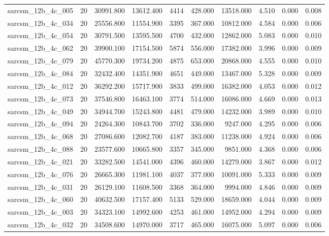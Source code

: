 \begin{tabular}{lrrrrrrrrr}
sarcsm\_12b\_4c\_005 & 20 & 30991.800 & 13612.400 & 4414 & 428.000 & 13518.000 & 4.510 & 0.000 & 0.008 \\
sarcsm\_12b\_4c\_034 & 20 & 25556.800 & 11554.900 & 3395 & 367.000 & 10812.000 & 4.584 & 0.000 & 0.006 \\
sarcsm\_12b\_4c\_054 & 20 & 30791.500 & 13595.500 & 4700 & 432.000 & 12862.000 & 5.083 & 0.000 & 0.010 \\
sarcsm\_12b\_4c\_062 & 20 & 39900.100 & 17154.500 & 5874 & 556.000 & 17382.000 & 3.996 & 0.000 & 0.009 \\
sarcsm\_12b\_4c\_079 & 20 & 45770.300 & 19734.200 & 4875 & 653.000 & 20868.000 & 4.555 & 0.000 & 0.010 \\
sarcsm\_12b\_4c\_084 & 20 & 32432.400 & 14351.900 & 4651 & 449.000 & 13467.000 & 5.328 & 0.000 & 0.009 \\
sarcsm\_12b\_4c\_012 & 20 & 36292.200 & 15717.900 & 3833 & 499.000 & 16382.000 & 4.053 & 0.000 & 0.012 \\
sarcsm\_12b\_4c\_073 & 20 & 37546.800 & 16463.100 & 3774 & 514.000 & 16086.000 & 4.669 & 0.000 & 0.013 \\
sarcsm\_12b\_4c\_049 & 20 & 34944.700 & 15243.800 & 4481 & 479.000 & 14232.000 & 3.989 & 0.000 & 0.010 \\
sarcsm\_12b\_4c\_094 & 20 & 24264.300 & 10843.700 & 3702 & 336.000 & 9247.000 & 4.295 & 0.000 & 0.006 \\
sarcsm\_12b\_4c\_068 & 20 & 27086.600 & 12082.700 & 4187 & 383.000 & 11238.000 & 4.924 & 0.000 & 0.006 \\
sarcsm\_12b\_4c\_088 & 20 & 23577.600 & 10665.800 & 3357 & 345.000 & 9851.000 & 4.368 & 0.000 & 0.006 \\
sarcsm\_12b\_4c\_021 & 20 & 33282.500 & 14541.000 & 4396 & 460.000 & 14279.000 & 3.867 & 0.000 & 0.012 \\
sarcsm\_12b\_4c\_076 & 20 & 26665.300 & 11981.100 & 4037 & 377.000 & 10091.000 & 5.333 & 0.000 & 0.009 \\
sarcsm\_12b\_4c\_031 & 20 & 26129.100 & 11608.500 & 3368 & 364.000 & 9994.000 & 4.846 & 0.000 & 0.009 \\
sarcsm\_12b\_4c\_060 & 20 & 40632.500 & 17157.400 & 5133 & 529.000 & 18659.000 & 4.044 & 0.000 & 0.009 \\
sarcsm\_12b\_4c\_003 & 20 & 34323.100 & 14992.600 & 4253 & 461.000 & 14952.000 & 4.294 & 0.000 & 0.009 \\
sarcsm\_12b\_4c\_032 & 20 & 34508.600 & 14970.000 & 3717 & 465.000 & 16075.000 & 5.097 & 0.000 & 0.006 \\

\end{tabular}
